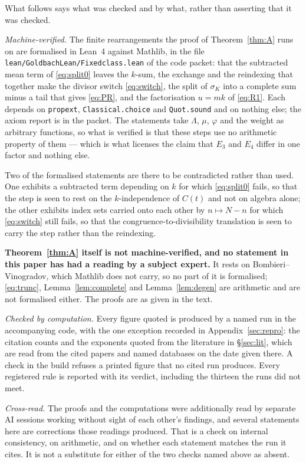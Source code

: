 \documentclass[11pt,a4paper]{article}
\theoremstyle{plain}
\theoremstyle{definition}
\theoremstyle{remark}
\begin{document}
What follows says what was checked and by what, rather than asserting
that it was checked.

\emph{Machine-verified.} The finite rearrangements the proof of
Theorem~\ref{thm:A} runs on are formalised in Lean~4 against Mathlib,
in the file \texttt{lean/GoldbachLean/Fixedclass.lean} of the code
packet: that the subtracted mean term of \eqref{eq:split0} leaves the
$k$-sum, the exchange and the reindexing that together make the divisor
switch \eqref{eq:switch}, the split of $\sigma_K$ into a complete sum
minus a tail that gives \eqref{eq:PR}, and the factorisation $u=mk$ of
\eqref{eq:R1}. Each depends on \texttt{propext},
\texttt{Classical.choice} and \texttt{Quot.sound} and on nothing else;
the axiom report is in the packet. The statements take $\Lambda$, $\mu$,
$\varphi$ and the weight as arbitrary functions, so what is verified is
that these steps use no arithmetic property of them --- which is what
licenses the claim that $E_3$ and $E_4$ differ in one factor and
nothing else.

Two of the formalised statements are there to be contradicted rather
than used. One exhibits a subtracted term depending on $k$ for which
\eqref{eq:split0} fails, so that the step is seen to rest on the
$k$-independence of $C(t)$ and not on algebra alone; the other exhibits
index sets carried onto each other by $n\mapsto N-n$ for which
\eqref{eq:switch} still fails, so that the congruence-to-divisibility
translation is seen to carry the step rather than the reindexing.

\textbf{Theorem~\ref{thm:A} itself is not machine-verified, and no
statement in this paper has had a reading by a subject expert.} It
rests on Bombieri--Vinogradov, which Mathlib does not carry, so no part
of it is formalised; \eqref{eq:trunc}, Lemma~\ref{lem:complete} and
Lemma~\ref{lem:degen} are arithmetic and are not formalised either. The
proofs are as given in the text.

\emph{Checked by computation.} Every figure quoted is produced by a
named run in the accompanying code, with the one exception recorded in
Appendix~\ref{sec:repro}: the citation counts and the exponents quoted
from the literature in \S\ref{sec:lit}, which are read from the cited
papers and named databases on the date given there. A check in the
build refuses a printed figure that no cited run produces. Every
registered rule is reported with its verdict, including the thirteen
the runs did not meet.

\emph{Cross-read.} The proofs and the computations were additionally
read by separate AI sessions working without sight of each other's
findings, and several statements here are corrections those readings
produced. That is a check on internal consistency, on arithmetic, and
on whether each statement matches the run it cites. It is not a
substitute for either of the two checks named above as absent.
\end{document}
